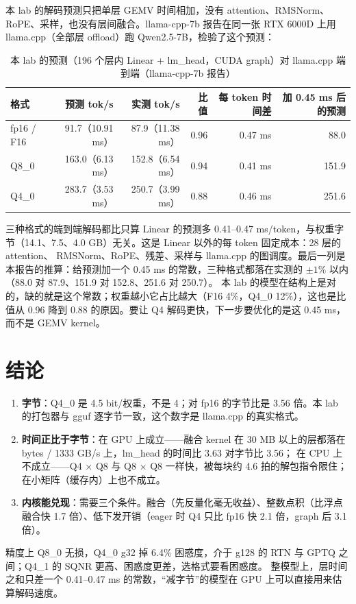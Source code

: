 \documentclass[11pt,a4paper]{ctexart}
\begin{document}
本 lab 的解码预测只把单层 GEMV 时间相加，没有 attention、RMSNorm、RoPE、采样，也没有层间融合。llama-cpp-7b 报告在同一张 RTX 6000D 上用 llama.cpp（全部层 offload）跑 Qwen2.5-7B，检验了这个预测：

\begin{table}[H]
\centering\small
\caption{本 lab 的预测（196 个层内 Linear + lm\_head，CUDA graph）对 llama.cpp 端到端（llama-cpp-7b 报告）}\label{tab:pred}
\begin{tabular}{lrrrrr}
\toprule
格式 & 预测 tok/s & 实测 tok/s & 比值 & 每 token 时间差 & 加 0.45 ms 后的预测 \\
\midrule
fp16 / F16 & 91.7（10.91 ms） & 87.9（11.38 ms） & 0.96 & 0.47 ms & 88.0 \\
Q8\_0 & 163.0（6.13 ms） & 152.8（6.54 ms） & 0.94 & 0.41 ms & 151.9 \\
Q4\_0 & 283.7（3.53 ms） & 250.7（3.99 ms） & 0.88 & 0.46 ms & 251.6 \\
\bottomrule
\end{tabular}
\end{table}

\begin{findingbox}[：层时间之和只差一个常数项]
三种格式的端到端解码都比只算 Linear 的预测多 0.41--0.47 ms/token，与权重字节（14.1、7.5、4.0 GB）无关。这是 Linear 以外的每 token 固定成本：28 层的 attention、
RMSNorm、RoPE、残差、采样与 llama.cpp 的图调度。最后一列是本报告的推算：给预测加一个 0.45 ms 的常数，三种格式都落在实测的 $\pm1\%$ 以内（88.0 对 87.9、151.9 对 152.8、251.6 对 250.7）。
本 lab 的模型在结构上是对的，缺的就是这个常数；权重越小它占比越大（F16 4\%，Q4\_0 12\%），这也是比值从 0.96 降到 0.88 的原因。要让 Q4 解码更快，下一步要优化的是这 0.45 ms，而不是 GEMV kernel。
\end{findingbox}

\section{结论}\label{sec:conclusion}

\begin{findingbox}
\begin{enumerate}[label=\arabic*.]
  \item \textbf{字节}：Q4\_0 是 4.5 bit/权重，不是 4；对 fp16 的字节比是 3.56 倍。本 lab 的打包器与 gguf 逐字节一致，这个数字是 llama.cpp 的真实格式。
  \item \textbf{时间正比于字节}：在 GPU 上成立——融合 kernel 在 30 MB 以上的层都落在 bytes / 1333 GB/s 上，lm\_head 的时间比 3.63 对字节比 3.56；
        在 CPU 上不成立——Q4 × Q8 与 Q8 × Q8 一样快，被每块约 4.6 拍的解包指令限住；在小矩阵（缓存内）上也不成立。
  \item \textbf{内核能兑现}：需要三个条件。融合（先反量化毫无收益）、整数点积（比浮点融合快 1.7 倍）、低下发开销（eager 时 Q4 只比 fp16 快 2.1 倍，graph 后 3.1 倍）。
\end{enumerate}
精度上 Q8\_0 无损，Q4\_0 g32 掉 6.4\% 困惑度，介于 g128 的 RTN 与 GPTQ 之间；Q4\_1 的 SQNR 更高、困惑度更差，选格式要看困惑度。
整模型上，层时间之和只差一个 0.41--0.47 ms 的常数，“减字节”的模型在 GPU 上可以直接用来估算解码速度。
\end{findingbox}
\end{document}
